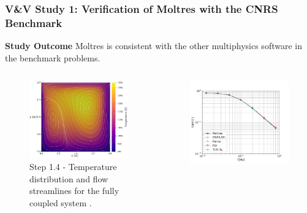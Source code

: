 \begin{frame}
  \frametitle{V\&V Study 1: Verification of Moltres with the CNRS Benchmark}
  \begin{block}{\textbf{Study Outcome}}
    Moltres is consistent with the other multiphysics software in the benchmark problems.
  \end{block}
  \begin{columns}
    \hfill
    \column[t]{4cm}
    \vspace{.3cm}
    \begin{figure}
      \centering
      \includegraphics[width=\columnwidth]{../images/full-coupled}
      \caption{Step 1.4 - Temperature distribution and flow streamlines for the fully
      coupled system \cite{park_verification_2022}.}
    \end{figure}
    \column[t]{4cm}
    \begin{figure}
      \centering
      \includegraphics[width=\columnwidth]{../images/2-1-gain-plot}

\end{figure}
\end{columns}
\end{frame}
